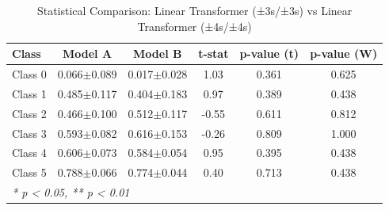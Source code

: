 \begin{table}[htbp]
\centering
\caption{Statistical Comparison: Linear Transformer (±3s/±3s) vs Linear Transformer (±4s/±4s)}
\label{tab:comparison_class_linear_transformer_±3s_±3s_vs_linear_transformer_±4s_±4s}
\begin{tabular}{lccccc}
\toprule
\textbf{Class} & \textbf{Model A} & \textbf{Model B} & \textbf{t-stat} & \textbf{p-value (t)} & \textbf{p-value (W)} \\
\midrule
Class 0 & 0.066$\pm$0.089 & 0.017$\pm$0.028 & 1.03 & 0.361 & 0.625 \\
Class 1 & 0.485$\pm$0.117 & 0.404$\pm$0.183 & 0.97 & 0.389 & 0.438 \\
Class 2 & 0.466$\pm$0.100 & 0.512$\pm$0.117 & -0.55 & 0.611 & 0.812 \\
Class 3 & 0.593$\pm$0.082 & 0.616$\pm$0.153 & -0.26 & 0.809 & 1.000 \\
Class 4 & 0.606$\pm$0.073 & 0.584$\pm$0.054 & 0.95 & 0.395 & 0.438 \\
Class 5 & 0.788$\pm$0.066 & 0.774$\pm$0.044 & 0.40 & 0.713 & 0.438 \\
\bottomrule
\multicolumn{6}{l}{\textit{* p < 0.05, ** p < 0.01}} \\
\end{tabular}
\end{table}